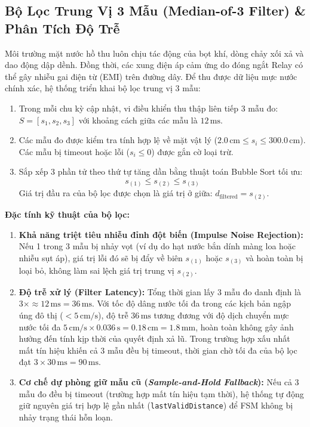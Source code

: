 \subsection{Bộ Lọc Trung Vị 3 Mẫu (Median-of-3 Filter) \& Phân Tích Độ Trễ}
Môi trường mặt nước hồ thu luôn chịu tác động của bọt khí, dòng chảy xối xả và dao động dập dềnh. Đồng thời, các xung điện áp cảm ứng do đóng ngắt Relay có thể gây nhiễu gai điện từ (EMI) trên đường dây. Để thu được dữ liệu mực nước chính xác, hệ thống triển khai bộ lọc trung vị 3 mẫu:
\begin{enumerate}
    \item Trong mỗi chu kỳ cập nhật, vi điều khiển thu thập liên tiếp 3 mẫu đo: $S = [s_1, s_2, s_3]$ với khoảng cách giữa các mẫu là $12\,\text{ms}$.
    \item Các mẫu đo được kiểm tra tính hợp lệ về mặt vật lý ($2.0\,\text{cm} \le s_i \le 300.0\,\text{cm}$). Các mẫu bị timeout hoặc lỗi ($s_i \le 0$) được gắn cờ loại trừ.
    \item Sắp xếp 3 phần tử theo thứ tự tăng dần bằng thuật toán Bubble Sort tối ưu:
    \begin{equation}
        s_{(1)} \le s_{(2)} \le s_{(3)}
    \end{equation}
    Giá trị đầu ra của bộ lọc được chọn là giá trị ở giữa: $d_{\text{filtered}} = s_{(2)}$.
\end{enumerate}
\textbf{Đặc tính kỹ thuật của bộ lọc:}
\begin{enumerate}
    \item \textbf{Khả năng triệt tiêu nhiễu đỉnh đột biến (Impulse Noise Rejection):} Nếu 1 trong 3 mẫu bị nhảy vọt (ví dụ do hạt nước bắn dính màng loa hoặc nhiễu sụt áp), giá trị lỗi đó sẽ bị đẩy về biên $s_{(1)}$ hoặc $s_{(3)}$ và hoàn toàn bị loại bỏ, không làm sai lệch giá trị trung vị $s_{(2)}$.
    \item \textbf{Độ trễ xử lý (Filter Latency):} Tổng thời gian lấy 3 mẫu đo danh định là $3 \times \approx 12\,\text{ms} = 36\,\text{ms}$. Với tốc độ dâng nước tối đa trong các kịch bản ngập úng đô thị ($< 5\,\text{cm/s}$), độ trễ $36\,\text{ms}$ tương đương với độ dịch chuyển mực nước tối đa $5\,\text{cm/s} \times 0.036\,\text{s} = 0.18\,\text{cm} = 1.8\,\text{mm}$, hoàn toàn không gây ảnh hưởng đến tính kịp thời của quyết định xả lũ. Trong trường hợp xấu nhất mất tín hiệu khiến cả 3 mẫu đều bị timeout, thời gian chờ tối đa của bộ lọc đạt $3 \times 30\,\text{ms} = 90\,\text{ms}$.
    \item \textbf{Cơ chế dự phòng giữ mẫu cũ (\textit{Sample-and-Hold Fallback}):} Nếu cả 3 mẫu đo đều bị timeout (trường hợp mất tín hiệu tạm thời), hệ thống tự động giữ nguyên giá trị hợp lệ gần nhất (\texttt{lastValidDistance}) để FSM không bị nhảy trạng thái hỗn loạn.
\end{enumerate}

